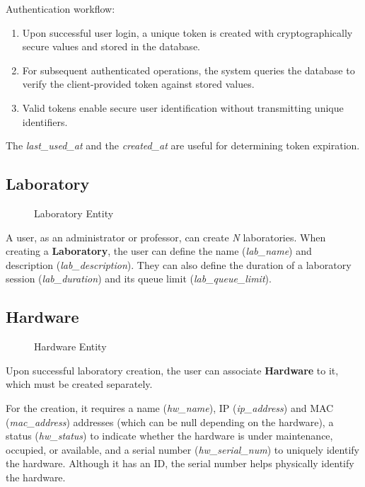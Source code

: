 Authentication workflow:

\begin{enumerate}
    \item Upon successful user login, a unique token is created with cryptographically secure values and stored in the database.
    \item For subsequent authenticated operations, the system queries the database to verify the client-provided token against stored values.
    \item Valid tokens enable secure user identification without transmitting unique identifiers.
\end{enumerate}

The \textit{last\_used\_at} and the \textit{created\_at} are useful for determining token expiration.

\subsection*{Laboratory}

\begin{figure}[H]
    \centering
    
    \caption{Laboratory Entity}
    \label{fig:laboratory_entity}
\end{figure}

A user, as an administrator or professor, can create \textit{N} laboratories. When creating a \textbf{Laboratory}, the user can define the name (\textit{lab\_name}) and description (\textit{lab\_description}). They can also define the duration of a laboratory session (\textit{lab\_duration}) and its queue limit (\textit{lab\_queue\_limit}).

\subsection*{Hardware}

\begin{figure}[H]
    \centering
    
    \caption{Hardware Entity}
    \label{fig:hardware_entity}
\end{figure}

Upon successful laboratory creation, the user can associate \textbf{Hardware} to it, which must be created separately.

For the creation, it requires a name (\textit{hw\_name}), IP (\textit{ip\_address}) and MAC (\textit{mac\_address}) addresses (which can be null depending on the hardware), a status (\textit{hw\_status}) to indicate whether the hardware is under maintenance, occupied, or available, and a serial number (\textit{hw\_serial\_num}) to uniquely identify the hardware. Although it has an ID, the serial number helps physically identify the hardware.    

